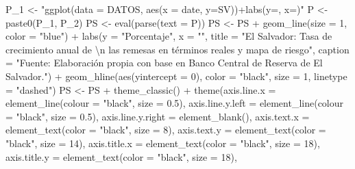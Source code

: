 \documentclass[
]{book}
\newenvironment{Shaded}{\begin{snugshade}}{\end{snugshade}}
\newcommand{\AttributeTok}[1]{\textcolor[rgb]{0.77,0.63,0.00}{#1}}
\newcommand{\DecValTok}[1]{\textcolor[rgb]{0.00,0.00,0.81}{#1}}
\newcommand{\FloatTok}[1]{\textcolor[rgb]{0.00,0.00,0.81}{#1}}
\newcommand{\FunctionTok}[1]{\textcolor[rgb]{0.00,0.00,0.00}{#1}}
\newcommand{\NormalTok}[1]{#1}
\newcommand{\OtherTok}[1]{\textcolor[rgb]{0.56,0.35,0.01}{#1}}
\newcommand{\SpecialCharTok}[1]{\textcolor[rgb]{0.00,0.00,0.00}{#1}}
\newcommand{\StringTok}[1]{\textcolor[rgb]{0.31,0.60,0.02}{#1}}
\begin{document}
\begin{Shaded}
\begin{Highlighting}[]
\NormalTok{P\_1 }\OtherTok{\textless{}{-}} \StringTok{"ggplot(data = DATOS, aes(x = date, y=SV))+labs(y=\textquotesingle{}\textquotesingle{}, x=\textquotesingle{}\textquotesingle{})"}
\NormalTok{P }\OtherTok{\textless{}{-}} \FunctionTok{paste0}\NormalTok{(P\_1, P\_2)}
\NormalTok{PS }\OtherTok{\textless{}{-}} \FunctionTok{eval}\NormalTok{(}\FunctionTok{parse}\NormalTok{(}\AttributeTok{text =}\NormalTok{ P))}
\NormalTok{PS }\OtherTok{\textless{}{-}}\NormalTok{ PS }\SpecialCharTok{+} \FunctionTok{geom\_line}\NormalTok{(}\AttributeTok{size =} \DecValTok{1}\NormalTok{, }\AttributeTok{color =} \StringTok{"blue"}\NormalTok{) }\SpecialCharTok{+} \FunctionTok{labs}\NormalTok{(}\AttributeTok{y =} \StringTok{"Porcentaje"}\NormalTok{,}
    \AttributeTok{x =} \StringTok{""}\NormalTok{, }\AttributeTok{title =} \StringTok{"El Salvador: Tasa de crecimiento anual de }\SpecialCharTok{\textbackslash{}n}\StringTok{ las remesas en términos reales y mapa de riesgo"}\NormalTok{,}
    \AttributeTok{caption =} \StringTok{"Fuente: Elaboración propia con base en Banco Central de Reserva de El Salvador."}\NormalTok{) }\SpecialCharTok{+}
    \FunctionTok{geom\_hline}\NormalTok{(}\FunctionTok{aes}\NormalTok{(}\AttributeTok{yintercept =} \DecValTok{0}\NormalTok{), }\AttributeTok{color =} \StringTok{"black"}\NormalTok{, }\AttributeTok{size =} \DecValTok{1}\NormalTok{,}
        \AttributeTok{linetype =} \StringTok{"dashed"}\NormalTok{)}
\NormalTok{PS }\OtherTok{\textless{}{-}}\NormalTok{ PS }\SpecialCharTok{+} \FunctionTok{theme\_classic}\NormalTok{() }\SpecialCharTok{+} \FunctionTok{theme}\NormalTok{(}\AttributeTok{axis.line.x =} \FunctionTok{element\_line}\NormalTok{(}\AttributeTok{colour =} \StringTok{"black"}\NormalTok{,}
    \AttributeTok{size =} \FloatTok{0.5}\NormalTok{), }\AttributeTok{axis.line.y.left =} \FunctionTok{element\_line}\NormalTok{(}\AttributeTok{colour =} \StringTok{"black"}\NormalTok{,}
    \AttributeTok{size =} \FloatTok{0.5}\NormalTok{), }\AttributeTok{axis.line.y.right =} \FunctionTok{element\_blank}\NormalTok{(), }\AttributeTok{axis.text.x =} \FunctionTok{element\_text}\NormalTok{(}\AttributeTok{color =} \StringTok{"black"}\NormalTok{,}
    \AttributeTok{size =} \DecValTok{8}\NormalTok{), }\AttributeTok{axis.text.y =} \FunctionTok{element\_text}\NormalTok{(}\AttributeTok{color =} \StringTok{"black"}\NormalTok{, }\AttributeTok{size =} \DecValTok{14}\NormalTok{),}
    \AttributeTok{axis.title.x =} \FunctionTok{element\_text}\NormalTok{(}\AttributeTok{color =} \StringTok{"black"}\NormalTok{, }\AttributeTok{size =} \DecValTok{18}\NormalTok{),}
    \AttributeTok{axis.title.y =} \FunctionTok{element\_text}\NormalTok{(}\AttributeTok{color =} \StringTok{"black"}\NormalTok{, }\AttributeTok{size =} \DecValTok{18}\NormalTok{),}

\end{Highlighting}
\end{Shaded}
\end{document}
